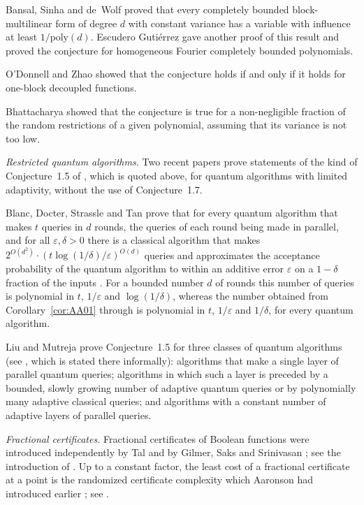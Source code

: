 \documentclass[11pt,reqno]{amsart}
\theoremstyle{definition}
\theoremstyle{remark}
\numberwithin{equation}{section}
\theoremstyle{named}
\theoremstyle{plain}
\newcommand{\eps}{\varepsilon}
\begin{document}
Bansal, Sinha and de~Wolf \cite{BSW} proved that every completely bounded block-multilinear form
of degree $d$ with constant variance has a variable with influence at least $1/\mathrm{poly}(d)$.
Escudero Guti\'errez \cite{EG} gave another proof of this result and proved the conjecture for
homogeneous Fourier completely bounded polynomials.

O'Donnell and Zhao \cite{OZ} showed that the conjecture holds if and only if it
holds for one-block decoupled functions.

Bhattacharya \cite[Theorem~6.4]{Bha} showed that the conjecture is true for
a non-negligible fraction of the random restrictions of a given polynomial, assuming that its variance
is not too low.

\medskip
\emph{Restricted quantum algorithms.} Two recent papers prove statements of the kind of
Conjecture~1.5 of \cite{AA14}, which is quoted above, for quantum algorithms with limited
adaptivity, without the use of Conjecture~1.7.

Blanc, Docter, Strassle and Tan \cite{BDST} prove
that for every quantum algorithm that makes $t$ queries in $d$ rounds, the queries of each round
being made in parallel, and for all $\eps,\delta>0$ there is a classical algorithm that makes
$2^{O(d^{2})}\cdot(t\log(1/\delta)/\eps)^{O(d)}$ queries and approximates the acceptance
probability of the quantum algorithm to within an additive error $\eps$ on a $1-\delta$ fraction of
the inputs \cite[Theorem~1]{BDST}. For a bounded number $d$ of rounds this number of queries is
polynomial in $t$, $1/\eps$ and $\log(1/\delta)$, whereas the number obtained from
Corollary~\ref{cor:AA01} through \cite[Theorem~3.3]{AA14} is polynomial in $t$, $1/\eps$ and
$1/\delta$, for every quantum algorithm.

Liu and Mutreja \cite{LM} prove Conjecture~1.5 for three
classes of quantum algorithms (see \cite[Theorem~1.2]{LM}, which is stated there informally):
algorithms that make a single layer of parallel quantum queries; algorithms in which such a layer is
preceded by a bounded, slowly growing number of adaptive quantum queries or by polynomially many
adaptive classical queries; and algorithms with a constant number of adaptive layers of parallel
queries.

\medskip
\emph{Fractional certificates.} Fractional certificates of Boolean functions were introduced independently
by Tal \cite{Tal} and by Gilmer, Saks and Srinivasan \cite{GSS}; see the introduction
of \cite{KT}. Up to a constant factor, the least cost of a fractional certificate at a point is the
randomized certificate complexity which Aaronson had introduced earlier \cite{Aar}; see
\cite[Appendix~A]{GSS}.
\end{document}
